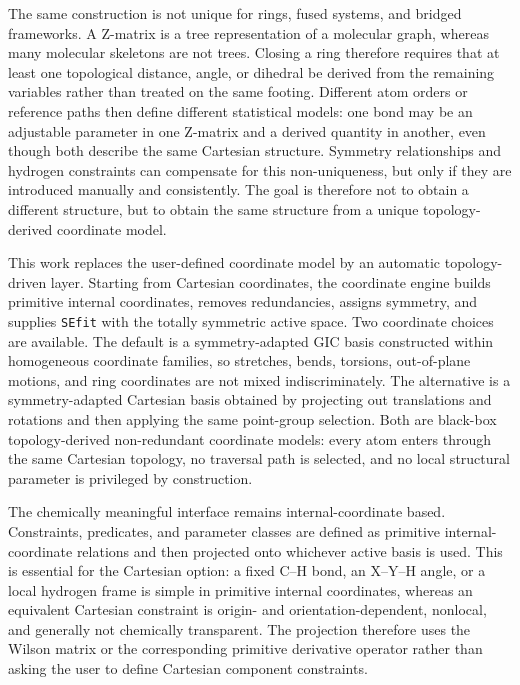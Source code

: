 \documentclass[journal=jctcce,manuscript=article,maxauthors=999]{achemso}
\begin{document}
The same construction is not unique for rings, fused systems, and bridged
frameworks. A Z-matrix is a tree representation of a molecular graph, whereas
many molecular skeletons are not trees. Closing a ring therefore requires that
at least one topological distance, angle, or dihedral be derived from the
remaining variables rather than treated on the same footing. Different atom
orders or reference paths then define different statistical models: one bond
may be an adjustable parameter in one Z-matrix and a derived quantity in
another, even though both describe the same Cartesian structure. Symmetry
relationships and hydrogen constraints can compensate for this non-uniqueness,
but only if they are introduced manually and consistently.
The goal is therefore not to obtain a different structure, but to obtain the
same structure from a unique topology-derived coordinate model.

This work replaces the user-defined coordinate model by an automatic
topology-driven layer. Starting from Cartesian coordinates, the coordinate
engine builds primitive internal coordinates, removes redundancies, assigns
symmetry, and supplies \texttt{SEfit} with the totally symmetric active space. Two
coordinate choices are available. The default is a symmetry-adapted GIC basis
constructed within homogeneous coordinate families, so stretches, bends,
torsions, out-of-plane motions, and ring coordinates are not mixed
indiscriminately. The alternative is a symmetry-adapted Cartesian basis
obtained by projecting out translations and rotations and then applying the
same point-group selection. Both are black-box topology-derived
non-redundant coordinate models: every atom enters through the same Cartesian
topology, no traversal path is selected, and no local structural parameter is
privileged by construction.

The chemically meaningful interface remains internal-coordinate based.
Constraints, predicates, and parameter classes are defined as primitive
internal-coordinate relations and then projected onto whichever active basis is
used. This is essential for the Cartesian option: a fixed C--H bond, an
X--Y--H angle, or a local hydrogen frame is simple in primitive internal
coordinates, whereas an equivalent Cartesian constraint is origin- and
orientation-dependent, nonlocal, and generally not chemically transparent. The
projection therefore uses the Wilson matrix or the corresponding primitive
derivative operator\cite{Wilson1955} rather than asking the user to define Cartesian component
constraints.
\end{document}
